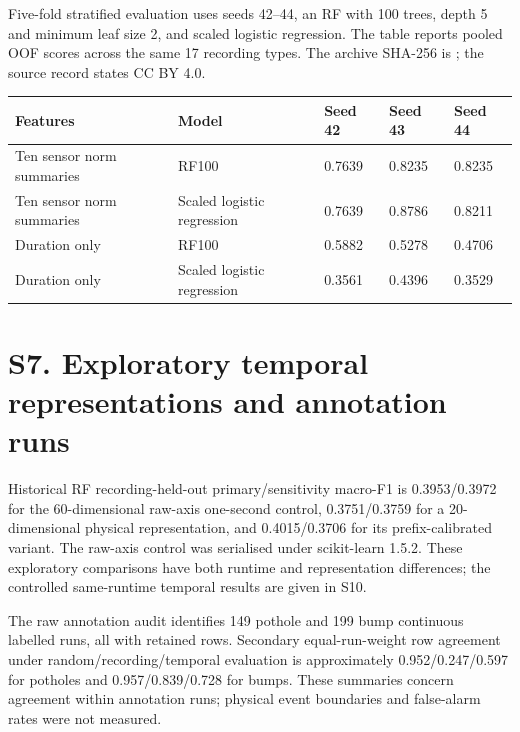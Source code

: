 Five-fold stratified evaluation uses seeds 42--44, an RF with 100 trees, depth 5 and minimum leaf size 2, and scaled logistic regression. The table reports pooled OOF scores across the same 17 recording types. The archive SHA-256 is ; the source record states CC BY 4.0.

\par\medskip
\begin{singlespace}\small
\noindent\begin{minipage}{\linewidth}
\centering
{}
\begin{tabularx}{\linewidth}{XYYYY}
\toprule
Features & Model & Seed 42 & Seed 43 & Seed 44 \\
\midrule
Ten sensor norm summaries & RF100 & 0.7639 & 0.8235 & 0.8235 \\
Ten sensor norm summaries & Scaled logistic regression & 0.7639 & 0.8786 & 0.8211 \\
Duration only & RF100 & 0.5882 & 0.5278 & 0.4706 \\
Duration only & Scaled logistic regression & 0.3561 & 0.4396 & 0.3529 \\
\bottomrule
\end{tabularx}
\end{minipage}
\end{singlespace}
\par\medskip
\section*{S7. Exploratory temporal representations and annotation runs}
Historical RF recording-held-out primary/sensitivity macro-F1 is 0.3953/0.3972 for the 60-dimensional raw-axis one-second control, 0.3751/0.3759 for a 20-dimensional physical representation, and 0.4015/0.3706 for its prefix-calibrated variant. The raw-axis control was serialised under scikit-learn 1.5.2. These exploratory comparisons have both runtime and representation differences; the controlled same-runtime temporal results are given in S10.

The raw annotation audit identifies 149 pothole and 199 bump continuous labelled runs, all with retained rows. Secondary equal-run-weight row agreement under random/recording/temporal evaluation is approximately 0.952/0.247/0.597 for potholes and 0.957/0.839/0.728 for bumps. These summaries concern agreement within annotation runs; physical event boundaries and false-alarm rates were not measured.

